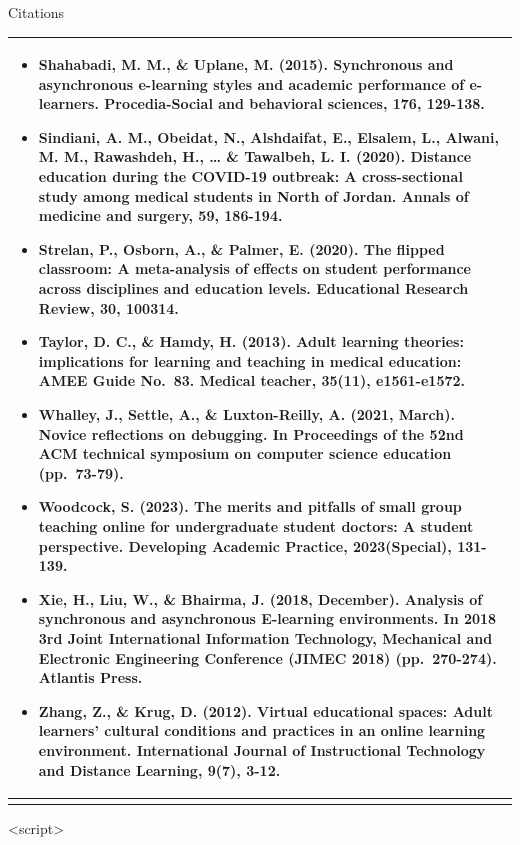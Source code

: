 \documentclass[
  ignorenonframetext,
]{beamer}
\begin{document}
\begin{frame}{Citations}
\begin{longtable}[]{@{}
  >{\raggedright\arraybackslash}p{}@{}}
\begin{minipage}[t]{\linewidth}
\begin{itemize}
  Journal of Lifelong Education, 30(3), 367-383.
\item
  Shahabadi, M. M., \& Uplane, M. (2015). Synchronous and asynchronous
  e-learning styles and academic performance of e-learners.
  Procedia-Social and behavioral sciences, 176, 129-138.
\item
  Sindiani, A. M., Obeidat, N., Alshdaifat, E., Elsalem, L., Alwani, M.
  M., Rawashdeh, H., \ldots{} \& Tawalbeh, L. I. (2020). Distance
  education during the COVID-19 outbreak: A cross-sectional study among
  medical students in North of Jordan. Annals of medicine and surgery,
  59, 186-194.
\item
  Strelan, P., Osborn, A., \& Palmer, E. (2020). The flipped classroom:
  A meta-analysis of effects on student performance across disciplines
  and education levels. Educational Research Review, 30, 100314.
\item
  Taylor, D. C., \& Hamdy, H. (2013). Adult learning theories:
  implications for learning and teaching in medical education: AMEE
  Guide No.~83. Medical teacher, 35(11), e1561-e1572.
\item
  Whalley, J., Settle, A., \& Luxton-Reilly, A. (2021, March). Novice
  reflections on debugging. In Proceedings of the 52nd ACM technical
  symposium on computer science education (pp.~73-79).
\item
  Woodcock, S. (2023). The merits and pitfalls of small group teaching
  online for undergraduate student doctors: A student perspective.
  Developing Academic Practice, 2023(Special), 131-139.
\item
  Xie, H., Liu, W., \& Bhairma, J. (2018, December). Analysis of
  synchronous and asynchronous E-learning environments. In 2018 3rd
  Joint International Information Technology, Mechanical and Electronic
  Engineering Conference (JIMEC 2018) (pp.~270-274). Atlantis Press.
\item
  Zhang, Z., \& Krug, D. (2012). Virtual educational spaces: Adult
  learners' cultural conditions and practices in an online learning
  environment. International Journal of Instructional Technology and
  Distance Learning, 9(7), 3-12.
\end{itemize}
\end{minipage} \\
\bottomrule\noalign{}
\end{longtable}
\end{frame}



<script>
\end{document}
